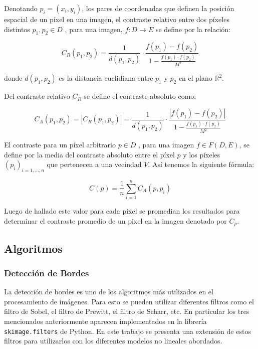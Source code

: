 Denotando $p_i =(x_i ,y_i )$, los pares de coordenadas que definen la posición espacial de un píxel en una imagen, el contraste relativo entre dos píxeles distintos $p_1 , p_2 \in D$ , para una imagen, $f : D \to E$ se define por la relación:

\begin{equation}
	C_R(p_1,p_2)=\frac{1}{d(p_1,p_2)}\cdot\frac{f(p_1)-f(p_2)}{1-\frac{f(p_1)\cdot f(p_2)}{M^2}}
\end{equation}

donde $d(p_1 ,p_2 )$ es la distancia euclidiana entre $p_1$ y $p_2$ en el plano $\mathbb{R}^2$.

Del contraste relativo $C_R$ se define el contraste absoluto como:

\begin{equation}
	C_A(p_1,p_2)=|C_R(p_1,p_2)|=\frac{1}{d(p_1,p_2)}\cdot\frac{|f(p_1)-f(p_2)|}{1-\frac{f(p_1)\cdot f(p_2)}{M^2}}
\end{equation}

El contraste para un píxel arbitrario $p \in D$ , para una imagen $f \in F ( D , E )$, se define por la media del contraste absoluto entre el píxel $p$ y los píxeles $( p_i )_{i = 1,...,n}$ que pertenecen a una vecindad $V$. Así tenemos la siguiente fórmula:

\begin{equation}
	\displaystyle C(p)=\frac{1}{n}\sum_{i=1}^{n}C_A(p,p_i)
\end{equation}

Luego de hallado este valor para cada pixel se promedian los resultados para determinar el contraste promedio de un pixel en la imagen denotado por $C_p$.

\subsection{Algoritmos}

\subsubsection{Detecci\'on de Bordes}

La detecci\'on de bordes es uno de los algoritmos m\'as utilizados en el procesamiento de im\'agenes. Para esto se pueden utilizar diferentes filtros como el filtro de Sobel, el filtro de Prewitt, el filtro de Scharr, etc. En particular los tres mencionados anteriormente aparecen implementados en la librer\'ia \verb|skimage.filters| de Python. En este trabajo se presenta una extensi\'on de estos filtros para utilizarlos con los diferentes modelos no lineales abordados. 


